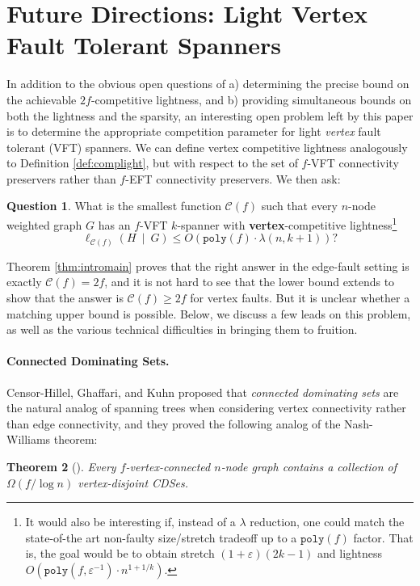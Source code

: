 \documentclass{article}
\theoremstyle{plain}
\newtheorem{theorem}{Theorem}
\theoremstyle{definition}
\newtheorem{question}[theorem]{Question}
\newcommand{\eps}{\varepsilon}
\begin{document}
\fi

\section{Future Directions: Light Vertex Fault Tolerant Spanners \label{sec:vft}}
In addition to the obvious open questions of a) determining the precise bound on the achievable $2f$-competitive lightness, and b) providing simultaneous bounds on both the lightness and the sparsity, an interesting open problem left by this paper is to determine the appropriate competition parameter for light \emph{vertex} fault tolerant (VFT) spanners. 
We can define vertex competitive lightness analogously to Definition \ref{def:complight}, but with respect to the set of $f$-VFT connectivity preservers rather than $f$-EFT connectivity preservers.
We then ask:

\begin{question}
What is the smallest function $\mathcal{C}(f)$ such that every $n$-node weighted graph $G$ has an $f$-VFT $k$-spanner with \textbf{vertex}-competitive lightness\footnote{It would also be interesting if, instead of a $\lambda$ reduction, one could match the state-of-the art non-faulty size/stretch tradeoff up to a $\texttt{poly}(f)$ factor.  That is, the goal would be to obtain stretch $(1+\eps)(2k-1)$ and lightness $O\left(\texttt{poly}(f, \eps^{-1}) \cdot n^{1+1/k}\right).$}
$$\ell_{\mathcal{C}(f)}(H \ \mid \ G) \le O\left( \texttt{poly}(f) \cdot \lambda(n, k+1) \right)?$$
\end{question}

Theorem \ref{thm:intromain} proves that the right answer in the edge-fault setting is exactly $\mathcal{C}(f) = 2f$, and it is not hard to see that the lower bound extends to show that the answer is $\mathcal{C}(f) \ge 2f$ for vertex faults.  But it is unclear whether a matching upper bound is possible.
Below, we discuss a few leads on this problem, as well as the various technical difficulties in bringing them to fruition.

\paragraph{Connected Dominating Sets.} 
Censor-Hillel, Ghaffari, and Kuhn \cite{CGK14} proposed that \emph{connected dominating sets} are the natural analog of spanning trees when considering vertex connectivity rather than edge connectivity, and they proved the following analog of the Nash-Williams theorem:
\begin{theorem} [\cite{CGK14}] \label{thm:CDS}
Every $f$-vertex-connected $n$-node graph contains a collection of $\Omega(f / \log n)$ vertex-disjoint CDSes.
\end{theorem}
\end{document}
